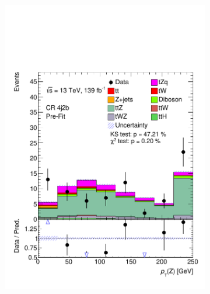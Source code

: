\begin{figure}[h!]
\begin{subfigure}[b]{0.32\linewidth}
    \includegraphics[width=\linewidth]{ubonn-thesis/Chapters/Chapters_05/Figure/CR_ttZ/CR_4j2b_Z_pt.pdf} 
  \end{subfigure} 
  \begin{subfigure}[b]{0.32\linewidth}
    \centering

\end{subfigure}
\end{figure}
